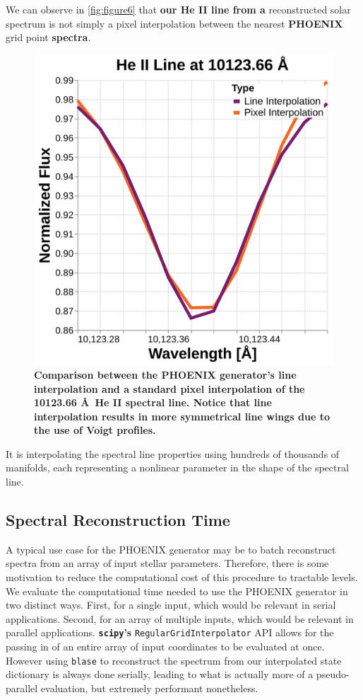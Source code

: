 \documentclass[twocolumn, linenumbers]{aastex631}
\begin{document}
We can observe in \autoref{fig:figure6} that \textbf{our He II line from a} reconstructed solar spectrum is not simply a pixel interpolation between the nearest \textbf{PHOENIX} grid point \textbf{spectra}.
\begin{figure}
    \centering
    \includegraphics[width=\columnwidth]{figure6}
    \caption{\textbf{Comparison between the PHOENIX generator's line interpolation and a standard pixel interpolation of the 10123.66 \AA \ He II spectral line.
    Notice that line interpolation results in more symmetrical line wings due to the use of Voigt profiles.}}
    \label{fig:figure6}
\end{figure}
It is interpolating the spectral line properties using hundreds of thousands of manifolds, each representing a nonlinear parameter in the shape of the spectral line.

\subsection{Spectral Reconstruction Time}
A typical use case for the PHOENIX generator may be to batch reconstruct spectra from an array of input stellar parameters.
Therefore, there is some motivation to reduce the computational cost of this procedure to tractable levels.
We evaluate the computational time needed to use the PHOENIX generator in two distinct ways.
First, for a single input, which would be relevant in serial applications.
Second, for an array of multiple inputs, which would be relevant in parallel applications.
\textbf{\texttt{scipy}'s} \texttt{RegularGridInterpolator} API allows for the passing in of an entire array of input coordinates to be evaluated at once.
However using \texttt{blase} to reconstruct the spectrum from our interpolated state dictionary is always done serially, leading to what is actually more of a pseudo-parallel evaluation, but extremely performant nonetheless.
\end{document}
